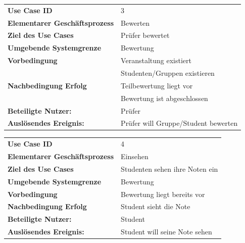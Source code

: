 	
			\begin{table}[H]
			\begin{tabular}{|ll}
			  \rowcolor{hellgrau}\textbf{Use Case ID} & 3 \\
		 	 \textbf{Elementarer Geschäftsprozess} &  Bewerten \\ 
			 \textbf{Ziel des Use Cases} & Prüfer bewertet  \\
			 \textbf{Umgebende Systemgrenze} & Bewertung \\ 
			 \textbf{Vorbedingung} & Veranstaltung existiert \\
			  					   & Studenten/Gruppen existieren \\ 
			 \textbf{Nachbedingung Erfolg} & Teilbewertung liegt vor \\
			 							   & Bewertung ist abgeschlossen\\
			 							    
			 \textbf{Beteiligte Nutzer:} & Prüfer \\ 
		     \textbf{Auslösendes Ereignis:} & Prüfer will Gruppe/Student bewerten \\ 
			 
			\end{tabular} 
			\label{tab:usecase_3}
			\end{table}
			
			\begin{table}[H]
			\begin{tabular}{|ll}
			  \rowcolor{hellgrau}\textbf{Use Case ID} & 4 \\
		 	 \textbf{Elementarer Geschäftsprozess} &  Einsehen \\ 
			 \textbf{Ziel des Use Cases} & Studenten sehen ihre Noten ein  \\
			 \textbf{Umgebende Systemgrenze} & Bewertung \\ 
			 \textbf{Vorbedingung} & Bewertung liegt bereits vor \\
			 \textbf{Nachbedingung Erfolg} & Student sieht die Note\\
			 			    
			 \textbf{Beteiligte Nutzer:} & Student \\ 
		     \textbf{Auslösendes Ereignis:} & Student will seine Note sehen\\ 
			 
			\end{tabular} 
			\label{tab:usecase_4}
			\end{table}
			
